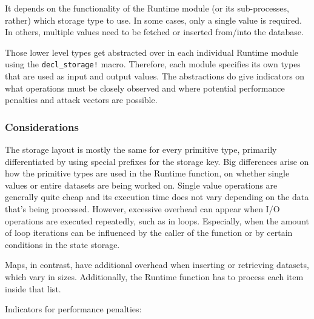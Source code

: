 \documentclass[11pt,a4paper]{article}
\begin{document}
It depends on the functionality of the Runtime module (or its sub-processes,
rather) which storage type to use. In some cases, only a single value is
required. In others, multiple values need to be fetched or inserted from/into
the database.
\newline

Those lower level types get abstracted over in each individual Runtime module
using the \verb|decl_storage!| macro. Therefore, each module specifies its own
types that are used as input and output values. The abstractions do give
indicators on what operations must be closely observed and where potential
performance penalties and attack vectors are possible.

\subsubsection{Considerations}\label{sect:primitive-types-considerations}

The storage layout is mostly the same for every primitive type, primarily
differentiated by using special prefixes for the storage key. Big differences
arise on how the primitive types are used in the Runtime function, on whether
single values or entire datasets are being worked on. Single value operations
are generally quite cheap and its execution time does not vary depending on the
data that's being processed. However, excessive overhead can appear when I/O
operations are executed repeatedly, such as in loops. Especially, when the amount
of loop iterations can be influenced by the caller of the function or by certain
conditions in the state storage.
\newline

Maps, in contrast, have additional overhead when inserting or retrieving
datasets, which vary in sizes. Additionally, the Runtime function has to process
each item inside that list.
\newline

Indicators for performance penalties:
\end{document}

